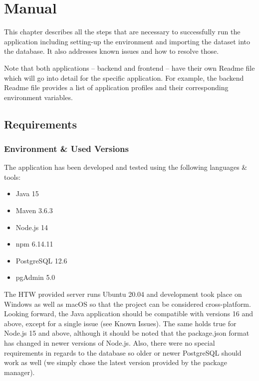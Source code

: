 \chapter{Manual}
\label{ch:Manual}

This chapter describes all the steps that are necessary to successfully run the application including setting-up the environment and importing the dataset into the database. It also addresses known issues and how to resolve those.

Note that both applications -- backend and frontend -- have their own Readme file which will go into detail for the specific application. For example, the backend Readme file provides a list of application profiles and their corresponding environment variables.

\section{Requirements}

\subsection{Environment \& Used Versions}

The application has been developed and tested using the following languages \& tools:

\begin{itemize}
    \item Java 15
    \item Maven 3.6.3
    \item Node.js 14
    \item npm 6.14.11
    \item PostgreSQL 12.6
    \item pgAdmin 5.0
\end{itemize}

The HTW provided server runs Ubuntu 20.04 and development took place on Windows as well as macOS so that the project can be considered cross-platform. Looking forward, the Java application should be compatible with versions 16 and above, except for a single issue (see Known Issues). The same holds true for Node.js 15 and above, although it should be noted that the package.json format has changed in newer versions of Node.js. Also, there were no special requirements in regards to the database so older or newer PostgreSQL should work as well (we simply chose the latest version provided by the package manager).

